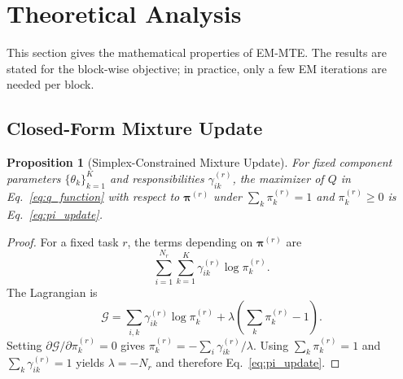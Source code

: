 ﻿\documentclass[12pt,a4paper]{article}
\newtheorem{proposition}{Proposition}
\begin{document}
\section{Theoretical Analysis}
\label{sec:theory}
This section gives the mathematical properties of EM-MTE. The results are
stated for the block-wise objective; in practice, only a few EM iterations
are needed per block.

\subsection{Closed-Form Mixture Update}
\begin{proposition}[Simplex-Constrained Mixture Update]
\label{prop:pi_update}
For fixed component parameters $\{\theta_k\}_{k=1}^{K}$ and responsibilities
$\gamma_{ik}^{(r)}$, the maximizer of $Q$ in Eq.~\eqref{eq:q_function} with
respect to $\bm{\pi}^{(r)}$ under $\sum_k\pi_k^{(r)}=1$ and
$\pi_k^{(r)}\geq0$ is Eq.~\eqref{eq:pi_update}.
\end{proposition}
\begin{proof}
For a fixed task $r$, the terms depending on $\bm{\pi}^{(r)}$ are
\begin{equation}
\sum_{i=1}^{N_r}\sum_{k=1}^{K}\gamma_{ik}^{(r)}\log\pi_k^{(r)}.
\end{equation}
The Lagrangian is
\begin{equation}
\mathcal{G}=\sum_{i,k}\gamma_{ik}^{(r)}\log\pi_k^{(r)}+\lambda\left(\sum_k\pi_k^{(r)}-1\right).
\end{equation}
Setting $\partial\mathcal{G}/\partial\pi_k^{(r)}=0$ gives
$\pi_k^{(r)}=-\sum_i\gamma_{ik}^{(r)}/\lambda$. Using $\sum_k\pi_k^{(r)}=1$
and $\sum_k\gamma_{ik}^{(r)}=1$ yields $\lambda=-N_r$ and therefore
Eq.~\eqref{eq:pi_update}.
\end{proof}
\end{document}

